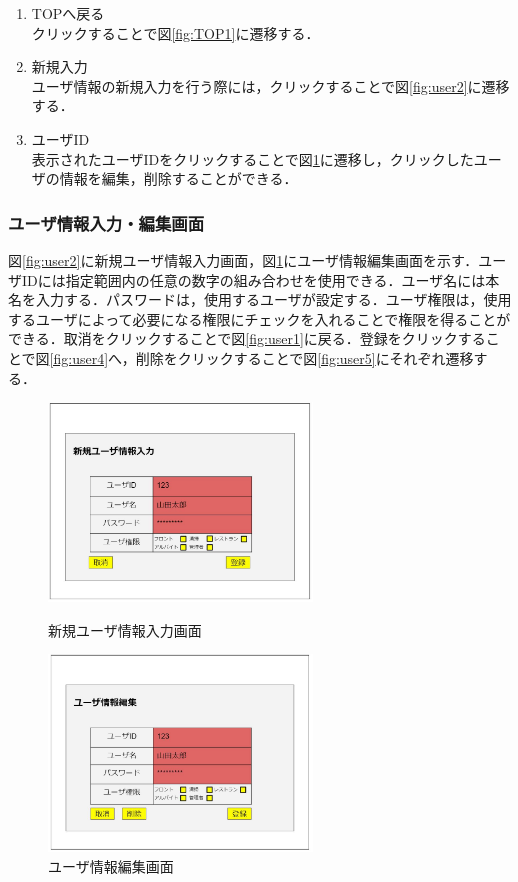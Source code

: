 \documentclass[main]{subfiles}
\begin{document}
\begin{enumerate}
\renewcommand{\labelenumi}{\textcircled{\scriptsize \theenumi}}
\item TOPへ戻る\\ クリックすることで図\ref{fig:TOP1}に遷移する．
\item 新規入力\\ ユーザ情報の新規入力を行う際には，クリックすることで図\ref{fig:user2}に遷移する．
\item ユーザID\\ 表示されたユーザIDをクリックすることで図\ref{fig:user3}に遷移し，クリックしたユーザの情報を編集，削除することができる．
\end{enumerate}

\subsubsection{ユーザ情報入力・編集画面}
図\ref{fig:user2}に新規ユーザ情報入力画面，図\ref{fig:user3}にユーザ情報編集画面を示す．ユーザIDには指定範囲内の任意の数字の組み合わせを使用できる．ユーザ名には本名を入力する．パスワードは，使用するユーザが設定する．ユーザ権限は，使用するユーザによって必要になる権限にチェックを入れることで権限を得ることができる．取消をクリックすることで図\ref{fig:user1}に戻る．登録をクリックすることで図\ref{fig:user4}へ，削除をクリックすることで図\ref{fig:user5}にそれぞれ遷移する．

\begin{figure}[H]
    \begin{minipage}{0.5\hsize}
        \centering
        \includegraphics[width=7cm]{UI-umino/user2.JPG}
        \caption{新規ユーザ情報入力画面}
        \label{fig:user2}
    \end{minipage}
    \begin{minipage}{0.5\hsize}
        \centering
        \includegraphics[width=7cm]{UI-umino/user3.JPG}
        \caption{ユーザ情報編集画面}
        \label{fig:user3}
    \end{minipage} 
\end{figure}
\end{document}
